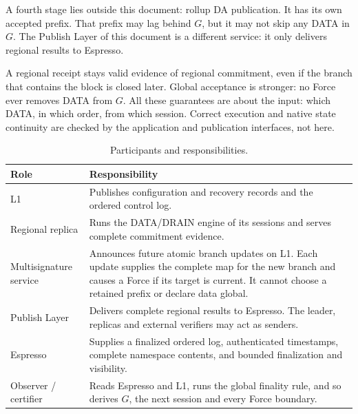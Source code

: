 \documentclass[11pt,a4paper]{article}
\begin{document}
A fourth stage lies outside this document: rollup DA publication. It
has its own accepted prefix. That prefix may lag behind $G$, but it may
not skip any DATA in $G$. The Publish Layer of this document is a
different service: it only delivers regional results to Espresso.

A regional receipt stays valid evidence of regional commitment, even if
the branch that contains the block is closed later. Global acceptance is
stronger: no Force ever removes DATA from $G$. All these guarantees are
about the input: which DATA, in which order, from which session. Correct
execution and native state continuity are checked by the application and
publication interfaces, not here.

\begin{table}[htbp]\centering\small
\caption{Participants and responsibilities.}\label{tab:roles}
\begin{tabularx}{\linewidth}{@{}>{\raggedright\arraybackslash}p{.19\linewidth}Y@{}}\toprule
Role & Responsibility\\\midrule
L1 & Publishes configuration and recovery records and the ordered control log.\\
Regional replica & Runs the DATA/DRAIN engine of its sessions and
serves complete commitment evidence.\\
Multisignature service & Announces future atomic branch updates on L1.
Each update supplies the complete map for the new branch and causes a
Force if its target is current. It cannot choose a retained prefix or
declare data global.\\
Publish Layer & Delivers complete regional results to Espresso. The
leader, replicas and external verifiers may act as senders.\\
Espresso & Supplies a finalized ordered log, authenticated timestamps,
complete namespace contents, and bounded finalization and visibility.\\
Observer / certifier & Reads Espresso and L1, runs the global finality
rule, and so derives $G$, the next session and every Force boundary.\\
\bottomrule
\end{tabularx}
\end{table}
\end{document}
